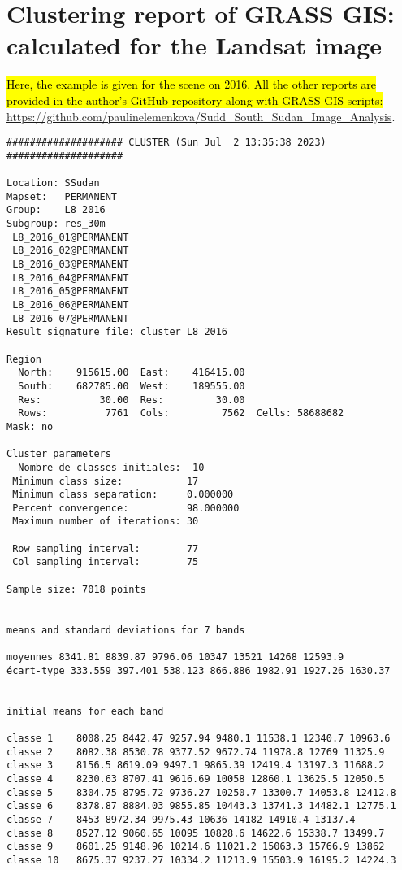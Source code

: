 \documentclass[sustainability,article,submit,pdftex,moreauthors]{Definitions/mdpi}
\begin{document}
\section[\appendixname~\thesection]{Clustering report of GRASS GIS: calculated for the Landsat image}\label{AppB}

\hl{Here, the example is given for the scene on 2016. All the other reports are provided in the author's GitHub repository along with GRASS GIS scripts:} \\\href{https://github.com/paulinelemenkova/Sudd_South_Sudan_Image_Analysis}{https://github.com/paulinelemenkova/Sudd\_South\_Sudan\_Image\_Analysis}. 

\begin{footnotesize}
\begin{verbatim}
#################### CLUSTER (Sun Jul  2 13:35:38 2023) ####################

Location: SSudan
Mapset:   PERMANENT
Group:    L8_2016
Subgroup: res_30m
 L8_2016_01@PERMANENT
 L8_2016_02@PERMANENT
 L8_2016_03@PERMANENT
 L8_2016_04@PERMANENT
 L8_2016_05@PERMANENT
 L8_2016_06@PERMANENT
 L8_2016_07@PERMANENT
Result signature file: cluster_L8_2016

Region
  North:    915615.00  East:    416415.00
  South:    682785.00  West:    189555.00
  Res:          30.00  Res:         30.00
  Rows:          7761  Cols:         7562  Cells: 58688682
Mask: no

Cluster parameters
  Nombre de classes initiales: 	10
 Minimum class size:           17
 Minimum class separation:     0.000000
 Percent convergence:          98.000000
 Maximum number of iterations: 30

 Row sampling interval:        77
 Col sampling interval:        75

Sample size: 7018 points


means and standard deviations for 7 bands

moyennes 8341.81 8839.87 9796.06 10347 13521 14268 12593.9
écart-type 333.559 397.401 538.123 866.886 1982.91 1927.26 1630.37


initial means for each band

classe 1    8008.25 8442.47 9257.94 9480.1 11538.1 12340.7 10963.6
classe 2    8082.38 8530.78 9377.52 9672.74 11978.8 12769 11325.9
classe 3    8156.5 8619.09 9497.1 9865.39 12419.4 13197.3 11688.2
classe 4    8230.63 8707.41 9616.69 10058 12860.1 13625.5 12050.5
classe 5    8304.75 8795.72 9736.27 10250.7 13300.7 14053.8 12412.8
classe 6    8378.87 8884.03 9855.85 10443.3 13741.3 14482.1 12775.1
classe 7    8453 8972.34 9975.43 10636 14182 14910.4 13137.4
classe 8    8527.12 9060.65 10095 10828.6 14622.6 15338.7 13499.7
classe 9    8601.25 9148.96 10214.6 11021.2 15063.3 15766.9 13862
classe 10   8675.37 9237.27 10334.2 11213.9 15503.9 16195.2 14224.3



\end{verbatim}
\end{footnotesize}
\end{document}
